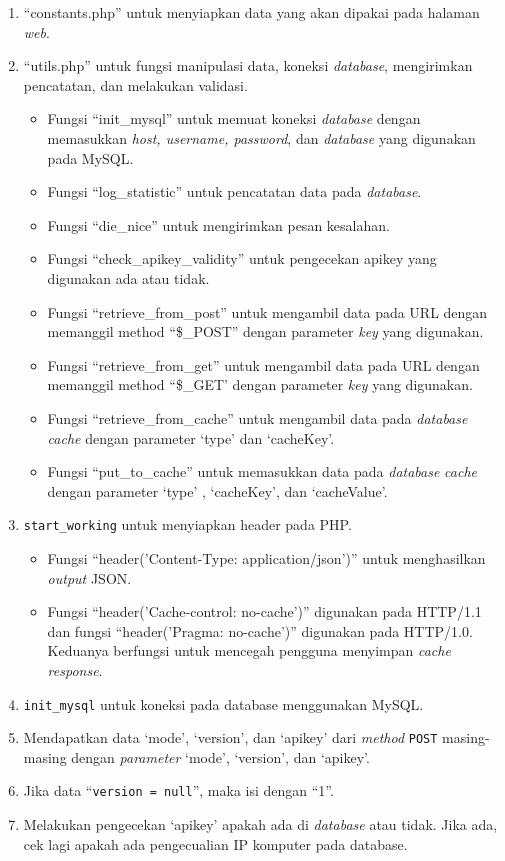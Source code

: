 \begin{enumerate}
	\item ``constants.php'' untuk menyiapkan data yang akan dipakai pada halaman \textit{web}.
	\item ``utils.php'' untuk fungsi manipulasi data, koneksi \textit{database}, mengirimkan pencatatan, dan melakukan validasi.
	\begin{itemize}
		\item Fungsi ``init\_mysql'' untuk memuat koneksi \textit{database} dengan memasukkan \textit{host, username, password}, dan \textit{database} yang digunakan pada MySQL.
		\item Fungsi ``log\_statistic'' untuk pencatatan data pada \textit{database}.
		\item Fungsi ``die\_nice'' untuk mengirimkan pesan kesalahan.
		\item Fungsi ``check\_apikey\_validity'' untuk pengecekan apikey yang digunakan ada atau tidak.
		\item Fungsi ``retrieve\_from\_post'' untuk mengambil data pada URL dengan memanggil method ``\$\_POST'' dengan parameter \textit{key} yang digunakan.
		\item Fungsi ``retrieve\_from\_get'' untuk mengambil data pada URL dengan memanggil method ``\$\_GET' dengan parameter \textit{key} yang digunakan.
		\item Fungsi ``retrieve\_from\_cache'' untuk mengambil data pada \textit{database} \textit{cache} dengan parameter `type' dan `cacheKey'.
		\item Fungsi ``put\_to\_cache'' untuk memasukkan data pada \textit{database} \textit{cache} dengan parameter `type' , `cacheKey', dan `cacheValue'.
	\end{itemize}
	\item \verb!start_working! untuk menyiapkan header pada PHP.
	\begin{itemize}
		\item Fungsi ``header('Content-Type: application/json')'' untuk menghasilkan \textit{output} JSON.
		\item Fungsi ``header('Cache-control: no-cache')'' digunakan pada HTTP/1.1 dan fungsi ``header('Pragma: no-cache')'' digunakan pada HTTP/1.0. Keduanya berfungsi untuk mencegah pengguna menyimpan \textit{cache response}.
	\end{itemize}
	\item \verb!init_mysql! untuk koneksi pada database menggunakan MySQL. 
	\item Mendapatkan data `mode', `version', dan `apikey' dari \textit{method} \verb!POST! masing-masing dengan \textit{parameter} `mode', `version', dan `apikey'.
	\item Jika data ``\texttt{version = null}'', maka isi dengan ``1''. 
	\item Melakukan pengecekan `apikey' apakah ada di \textit{database} atau tidak. Jika ada, cek lagi apakah ada pengecualian IP komputer pada database.
\end{enumerate}

